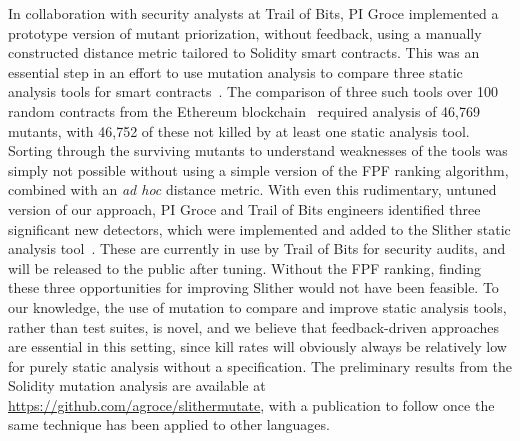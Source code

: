In collaboration with security analysts at Trail of Bits, PI Groce
implemented a prototype version of mutant priorization, without
feedback, using a manually constructed distance metric tailored to
Solidity smart contracts.  This was an essential step in an effort to
use mutation analysis to compare three static analysis tools for smart
contracts~\cite{slitherpaper,sc:smartcheck,securify}.  The comparison of three such tools over 100 random contracts
from the Ethereum blockchain~\cite{buterin2013whitepaper,wood2014yellow} required analysis of 46,769 mutants, with
46,752 of these not killed by at least one static analysis tool.
Sorting through the surviving mutants to understand weaknesses of the
tools was simply not possible without using a simple version of the
FPF ranking algorithm, combined with an \emph{ad hoc} distance
metric.  With even this rudimentary, untuned version of our approach,
PI Groce and Trail of Bits engineers identified three significant new
detectors, which were implemented and added to the Slither static
analysis tool~\cite{slitherpaper}.  These are currently in use by Trail of Bits for
security audits, and will be released to the public after tuning.  Without the FPF ranking, finding these three
opportunities for improving Slither would not have been feasible.  To
our knowledge, the use of mutation to compare and improve static
analysis tools, rather than test suites, is novel, and we believe that
feedback-driven approaches are essential in this setting, since kill
rates will obviously always be relatively low for purely static
analysis without a specification.  The preliminary results from the
Solidity mutation analysis are available at
\url{https://github.com/agroce/slithermutate}, with a publication to
follow once the same technique has been applied to other languages.







